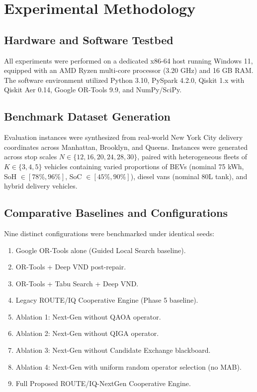 \section{Experimental Methodology}
\label{sec:methodology}
\subsection{Hardware and Software Testbed}
All experiments were performed on a dedicated x86-64 host running Windows 11, equipped with an AMD Ryzen multi-core processor (3.20 GHz) and 16 GB RAM. The software environment utilized Python 3.10, PySpark 4.2.0, Qiskit 1.x with Qiskit Aer 0.14, Google OR-Tools 9.9, and NumPy/SciPy.

\subsection{Benchmark Dataset Generation}
Evaluation instances were synthesized from real-world New York City delivery coordinates across Manhattan, Brooklyn, and Queens. Instances were generated across stop scales $N \in \{12, 16, 20, 24, 28, 30\}$, paired with heterogeneous fleets of $K \in \{3, 4, 5\}$ vehicles containing varied proportions of BEVs (nominal 75 kWh, SoH $\in [78\%, 96\%]$, SoC $\in [45\%, 90\%]$), diesel vans (nominal 80L tank), and hybrid delivery vehicles.

\subsection{Comparative Baselines and Configurations}
Nine distinct configurations were benchmarked under identical seeds:
\begin{enumerate}
    \item Google OR-Tools alone (Guided Local Search baseline).
    \item OR-Tools + Deep VND post-repair.
    \item OR-Tools + Tabu Search + Deep VND.
    \item Legacy ROUTE/IQ Cooperative Engine (Phase 5 baseline).
    \item Ablation 1: Next-Gen without QAOA operator.
    \item Ablation 2: Next-Gen without QIGA operator.
    \item Ablation 3: Next-Gen without Candidate Exchange blackboard.
    \item Ablation 4: Next-Gen with uniform random operator selection (no MAB).
    \item Full Proposed ROUTE/IQ-NextGen Cooperative Engine.
\end{enumerate}
